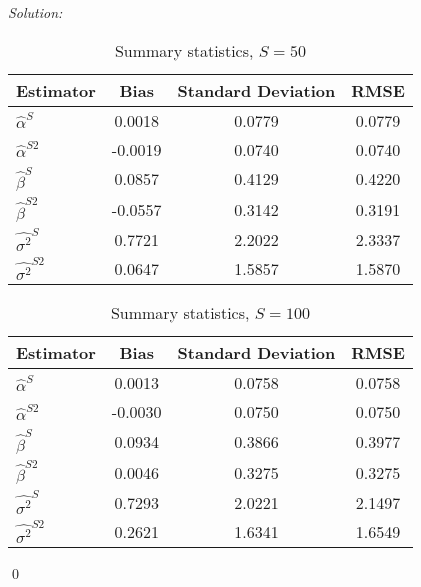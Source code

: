 \documentclass[12pt]{article}
\newenvironment{sol}
    {\emph{Solution:}
    }
    {
    \qed
    }
\begin{document}
\begin{sol}
    \begin{enumerate}[label=\alph*) ]
        
        \begin{table}[htbp]
            \centering
            \caption{Summary statistics, $S = 50$}
              \begin{tabular}{lccc}
                  \toprule
                    Estimator                & Bias             & Standard Deviation         & RMSE           \\
                  \midrule
                    $\hat{\alpha}^S $     &  0.0018       & 0.0779     &     0.0779      \\
                    $\hat{\alpha}^{S2}$   & -0.0019 &  0.0740     &  0.0740             \\
                    $\hat{\beta}^S $     &  0.0857     &  0.4129  &  0.4220        \\
                    $\hat{\beta}^{S2}$   & -0.0557 &  0.3142   & 0.3191            \\
                    $\hat{\sigma^2}^S $     & 0.7721    &  2.2022    &   2.3337     \\
                    $\hat{\sigma^2}^{S2}$   & 0.0647 &  1.5857   &   1.5870           \\
                  \bottomrule
              \end{tabular}
            \label{tab:cf10}
          \end{table}

          \begin{table}[htbp]
            \centering
            \caption{Summary statistics, $S = 100$}
              \begin{tabular}{lccc}
                  \toprule
                    Estimator                & Bias             & Standard Deviation         & RMSE           \\
                  \midrule
                    $\hat{\alpha}^S $     & 0.0013  & 0.0758 &  0.0758   \\
                    $\hat{\alpha}^{S2}$   &-0.0030 & 0.0750  &   0.0750       \\
                    $\hat{\beta}^S $     &  0.0934  & 0.3866 &   0.3977  \\
                    $\hat{\beta}^{S2}$   &  0.0046& 0.3275  &    0.3275     \\
                    $\hat{\sigma^2}^S $     & 0.7293  &  2.0221&   2.1497  \\
                    $\hat{\sigma^2}^{S2}$   & 0.2621 &  1.6341&   1.6549      \\
                  \bottomrule
              \end{tabular}
            \label{tab:cf10}
          \end{table}
        \end{enumerate}
        

\end{sol}
\end{document}
